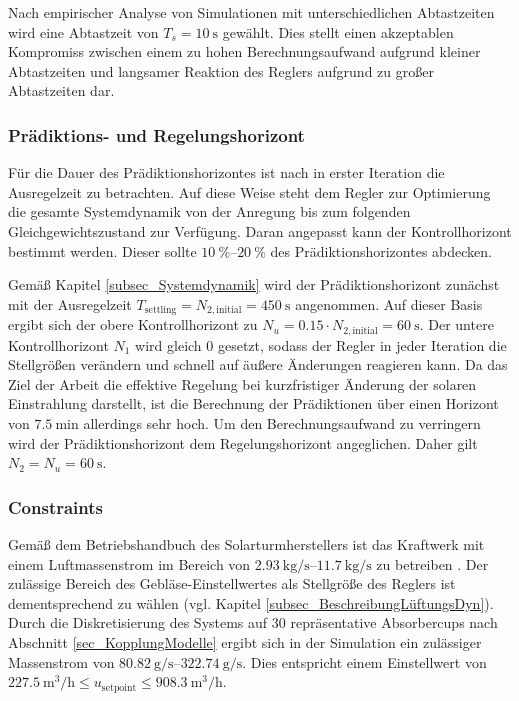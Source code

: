 Nach empirischer Analyse von Simulationen mit unterschiedlichen Abtastzeiten wird eine Abtastzeit von $T_s=\SI{10}{\second}$ gewählt.
Dies stellt einen akzeptablen Kompromiss zwischen einem zu hohen Berechnungsaufwand aufgrund kleiner Abtastzeiten und langsamer Reaktion des Reglers aufgrund zu großer Abtastzeiten dar.


\subsubsection*{Prädiktions- und Regelungshorizont} \label{subsubsec_horizonte}
Für die Dauer des Prädiktionshorizontes ist nach \cite{Bemporad} in erster Iteration die Ausregelzeit zu betrachten.
Auf diese Weise steht dem Regler zur Optimierung die gesamte Systemdynamik von der Anregung bis zum folgenden Gleichgewichtszustand zur Verfügung.
Daran angepasst kann der Kontrollhorizont bestimmt werden.
Dieser sollte $\SIrange{10}{20}{\percent}$ des Prädiktionshorizontes abdecken.

Gemäß Kapitel \ref{subsec_Systemdynamik} wird der Prädiktionshorizont zunächst mit der Ausregelzeit $T_{\mathrm{settling}} = N_{2,\mathrm{initial}} = \SI{450}{\second}$ angenommen.
Auf dieser Basis ergibt sich der obere Kontrollhorizont zu $N_u = 0.15\cdot N_{2,\mathrm{initial}} = \SI{60}{\second}$.
Der untere Kontrollhorizont $N_1$ wird gleich $0$ gesetzt, sodass der Regler in jeder Iteration die Stellgrößen verändern und schnell auf äußere Änderungen reagieren kann.
Da das Ziel der Arbeit die effektive Regelung bei kurzfristiger Änderung der solaren Einstrahlung darstellt, ist die Berechnung der Prädiktionen über einen Horizont von $\SI{7.5}{\minute}$ allerdings sehr hoch.
Um den Berechnungsaufwand zu verringern wird der Prädiktionshorizont dem Regelungshorizont angeglichen.
Daher gilt $N_2 = N_u = \SI{60}{\second}$.

\subsubsection*{Constraints} \label{subsubsec_constraints}
Gemäß dem Betriebshandbuch des Solarturmherstellers ist das Kraftwerk mit einem Luftmassenstrom im Bereich von $\SIrange{2.93}{11.7}{\kilo\gram\per\second}$ zu betreiben \cite[S.28]{HandbuchJülich}.
Der zulässige Bereich des Gebläse-Einstellwertes als Stellgröße des Reglers ist dementsprechend zu wählen (vgl. Kapitel \ref{subsec_BeschreibungLüftungsDyn}).
Durch die Diskretisierung des Systems auf 30 repräsentative Absorbercups nach Abschnitt \ref{sec_KopplungModelle} ergibt sich in der Simulation ein zulässiger Massenstrom von $\SIrange{80.82}{322.74}{\gram\per\second}$.
Dies entspricht einem Einstellwert von $\SI{227.5}{\metre\cubed\per\hour} \leq u_{\mathrm{setpoint}} \leq \SI{908.3}{\metre\cubed\per\hour}$.

